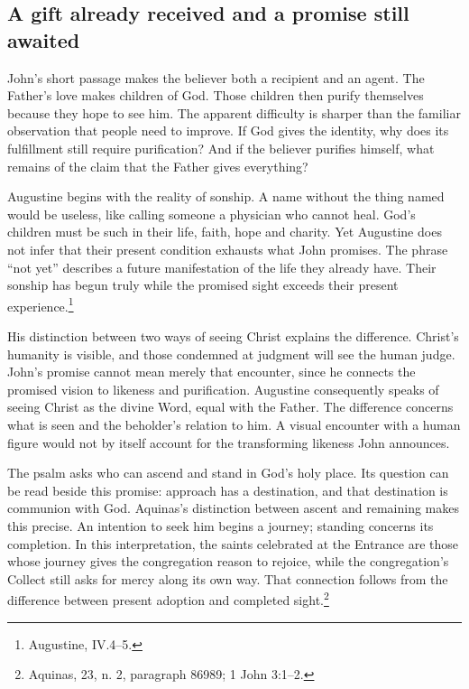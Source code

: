 \subsection{A gift already received and a promise still awaited}
John's short passage makes the believer both a recipient and an agent. The Father's love makes children of God. Those children then purify themselves because they hope to see him. The apparent difficulty is sharper than the familiar observation that people need to improve. If God gives the identity, why does its fulfillment still require purification? And if the believer purifies himself, what remains of the claim that the Father gives everything?

Augustine begins with the reality of sonship. A name without the thing named would be useless, like calling someone a physician who cannot heal. God's children must be such in their life, faith, hope and charity. Yet Augustine does not infer that their present condition exhausts what John promises. The phrase ``not yet'' describes a future manifestation of the life they already have. Their sonship has begun truly while the promised sight exceeds their present experience.\footnote{Augustine,  IV.4--5.}

His distinction between two ways of seeing Christ explains the difference. Christ's humanity is visible, and those condemned at judgment will see the human judge. John's promise cannot mean merely that encounter, since he connects the promised vision to likeness and purification. Augustine consequently speaks of seeing Christ as the divine Word, equal with the Father. The difference concerns what is seen and the beholder's relation to him. A visual encounter with a human figure would not by itself account for the transforming likeness John announces.

The psalm asks who can ascend and stand in God's holy place. Its question can be read beside this promise: approach has a destination, and that destination is communion with God. Aquinas's distinction between ascent and remaining makes this precise. An intention to seek him begins a journey; standing concerns its completion. In this interpretation, the saints celebrated at the Entrance are those whose journey gives the congregation reason to rejoice, while the congregation's Collect still asks for mercy along its own way. That connection follows from the difference between present adoption and completed sight.\footnote{Aquinas,  23, n. 2, paragraph 86989; 1 John 3:1--2.}

